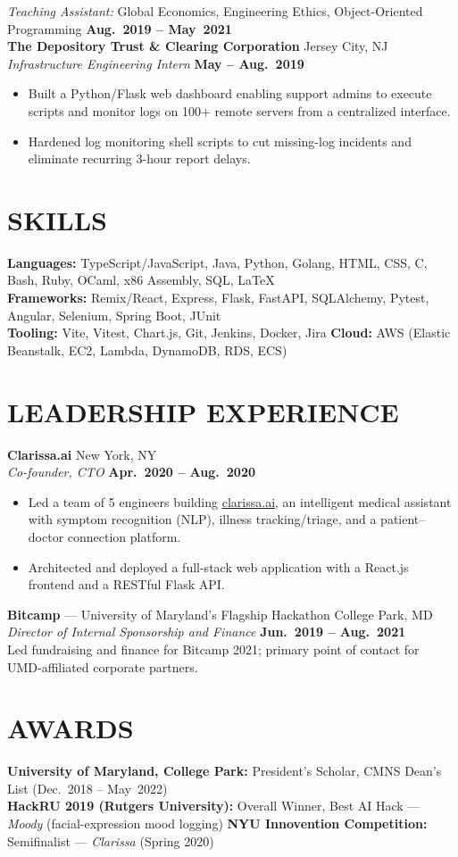\documentclass[10pt]{article}
\begin{document}
\emph{Teaching Assistant:} Global Economics, Engineering Ethics, Object-Oriented Programming \hfill \textbf{Aug.\ 2019 -- May\ 2021} \\
\textbf{The Depository Trust \& Clearing Corporation} \hfill Jersey City, NJ\\
\emph{Infrastructure Engineering Intern} \hfill \textbf{May -- Aug.\ 2019}
\begin{itemize}
  \item Built a Python/Flask web dashboard enabling support admins to execute scripts and monitor logs on 100+ remote servers from a centralized interface.
  \item Hardened log monitoring shell scripts to cut missing-log incidents and eliminate recurring 3-hour report delays.
\end{itemize}

\section*{SKILLS}
\textbf{Languages:} TypeScript/JavaScript, Java, Python, Golang, HTML, CSS, C, Bash, Ruby, OCaml, x86 Assembly, SQL, \LaTeX \\
\textbf{Frameworks:} Remix/React, Express, Flask, FastAPI, SQLAlchemy, Pytest, Angular, Selenium, Spring Boot, JUnit \\
\textbf{Tooling:} Vite, Vitest, Chart.js, Git, Jenkins, Docker, Jira \quad \textbf{Cloud:} AWS (Elastic Beanstalk, EC2, Lambda, DynamoDB, RDS, ECS)

\section*{LEADERSHIP EXPERIENCE}
\textbf{Clarissa.ai} \hfill New York, NY\\
\emph{Co-founder, CTO} \hfill \textbf{Apr.\ 2020 -- Aug.\ 2020}
\begin{itemize}
  \item Led a team of 5 engineers building \href{https://clarissa.ai}{clarissa.ai}, an intelligent medical assistant with symptom recognition (NLP), illness tracking/triage, and a patient–doctor connection platform.
  \item Architected and deployed a full-stack web application with a React.js frontend and a RESTful Flask API.
\end{itemize}
\textbf{Bitcamp} — University of Maryland’s Flagship Hackathon \hfill College Park, MD\\
\emph{Director of Internal Sponsorship and Finance} \hfill \textbf{Jun.\ 2019 -- Aug.\ 2021}\\
Led fundraising and finance for Bitcamp 2021; primary point of contact for UMD-affiliated corporate partners.

\section*{AWARDS}
\textbf{University of Maryland, College Park:} President’s Scholar, CMNS Dean’s List (Dec.\ 2018 -- May\ 2022) \\
\textbf{HackRU 2019 (Rutgers University):} Overall Winner, Best AI Hack — \emph{Moody} (facial-expression mood logging)
\textbf{NYU Innovention Competition:} Semifinalist — \emph{Clarissa} (Spring 2020)
\end{document}

